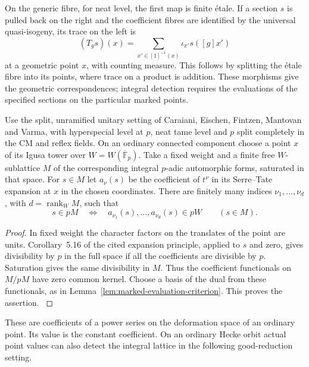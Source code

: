 On the generic
fibre, for neat level, the first map is finite \'etale. If a section
\(s\) is pulled back on the right and the coefficient fibres are
identified by the universal quasi-isogeny, its trace on the left is
\[
      (T_gs)(x)=\sum_{x'\in [1]^{-1}(x)}\iota_{x'}s([g]x')
\]
at a geometric point \(x\), with counting measure. This follows by
splitting the \'etale fibre into its points, where trace on a product
is addition. These morphisms give the geometric correspondences;
integral detection requires the evaluations of the specified sections
on the particular marked points. \cite[Section~13]{lan-ramified-models}

\begin{auxlemma}\label{lem:ordinary-finite-jet-detection}
Use the split, unramified unitary setting of Caraiani, Eischen,
Fintzen, Mantovan and Varma, with hyperspecial level at \(p\), neat
tame level and \(p\) split completely in the CM and reflex fields.
On an ordinary connected component choose a point \(x\) of its
Igusa tower over \(W=W(\overline{\mathbb F}_p)\). Take a fixed
weight and a finite free \(W\)-sublattice \(M\) of the corresponding
integral \(p\)-adic automorphic forms, saturated in that space.
For \(s\in M\) let \(a_\nu(s)\) be the coefficient of \(t^\nu\)
in its Serre--Tate expansion at \(x\) in the chosen coordinates.
There are finitely many indices \(\nu_1,\ldots,\nu_d\), with
\(d=\operatorname{rank}_WM\), such that
\[
  s\in pM\quad\Longleftrightarrow\quad
      a_{\nu_1}(s),\ldots,a_{\nu_d}(s)\in pW \qquad(s\in M).
\]
\end{auxlemma}
\begin{proof}
In fixed weight the character factors on the translates of the point
are units. Corollary~5.16 of the cited expansion principle, applied
to \(s\) and zero, gives divisibility by \(p\) in the full space if
all the coefficients are divisible by \(p\). Saturation gives the
same divisibility in \(M\). Thus the coefficient functionals on
\(M/pM\) have zero common kernel. Choose a basis of the dual from
these functionals, as in Lemma~\ref{lem:marked-evaluation-criterion}.
This proves the assertion. \cite[Theorem~5.14 and Corollary~5.16]{cef-mv-expansions}
\end{proof}

These are coefficients of a power series on the deformation space of
an ordinary point. Its value is the constant coefficient. On an
ordinary Hecke orbit actual point values can also detect the
integral lattice in the following good-reduction setting.

